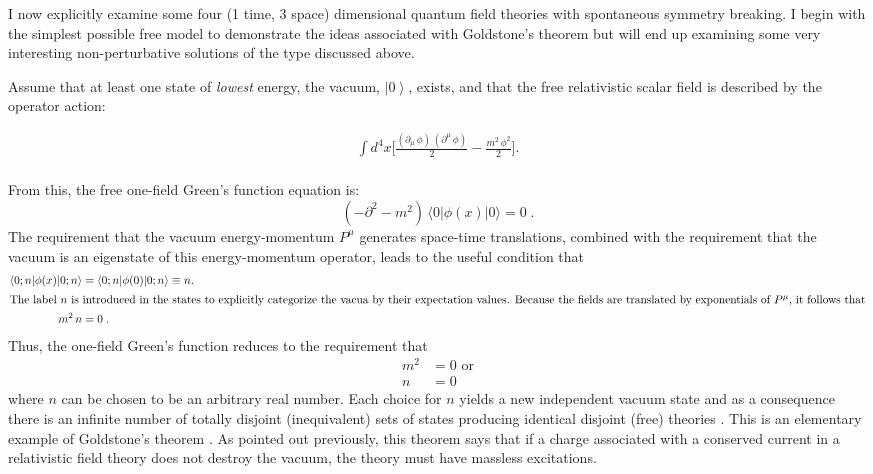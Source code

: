 \documentclass[12pt]{article}
\newcommand{\pa}{\partial}
\newcommand{\ket}[1]{\left| #1\right\rangle}
\newcommand{\ipop}[3]{\ensuremath{\langle#1 | #2 | #3\rangle}\xspace}
\begin{document}
     I now explicitly examine some four (1 time, 3 space) dimensional quantum field theories
     with spontaneous symmetry breaking. I begin with the simplest possible
     free model to demonstrate the ideas associated with Goldstone's theorem but
     will end up examining some very interesting non-perturbative solutions of
     the type discussed above.

    Assume that at least one state of \emph{lowest} energy, the vacuum,
    $\ket{0}$, exists, and that the free relativistic scalar
    field is described by the operator action:

    \begin{align*}
      \int d^4x \bigg[\frac{(\pa_{\mu}\, \phi)\, (\pa^{\mu}\, \phi)}{2} - \frac{m^2\,
        \phi^2}{2} \bigg] .\\
       \end{align*}

    From this, the free one-field Green's function equation is:
    \begin{equation*}
      (-\pa^2 - m^2)\, \ipop{0}{\phi(x)}{0} = 0\; .
    \end{equation*}
    The requirement that the vacuum energy-momentum  $P^{\mu}$ generates space-time
    translations, combined with the requirement that the vacuum is an
    eigenstate of this energy-momentum operator, leads to the useful condition that
    \begin{align*}
      \ipop{0;n}{\phi(x)}{0;n} &= \ipop{0;n}{\phi(0)}{0;n} \equiv n. \\
      \intertext{The label $n$ is introduced in the states to
        explicitly categorize the vacua by their expectation values. Because
        the fields are translated by exponentials of $P^{\mu}$, it follows
        that} m^2\, n &= 0 \; .
    \end{align*}
    Thus, the one-field Green's function reduces
    to the requirement that
    \begin{align*}
      m^2 &= 0 \text{ or} \\
      n &= 0
    \end{align*}
    where $n$ can be chosen to be an arbitrary real number. Each choice for $n$
    yields a new independent vacuum state and as a consequence there is an
    infinite number of totally disjoint (inequivalent) sets of states
    producing identical disjoint (free) theories \cite{ggfu;1964}.  This is
    an elementary example of Goldstone's theorem
    \cite{Nambu:1961tp,Nambu;1961tp2,jg;1961,gsw;1962}. As
    pointed out previously, this theorem says that if a charge associated with
    a conserved current in a relativistic field theory does not destroy the
    vacuum, the theory must have massless excitations.
\end{document}
